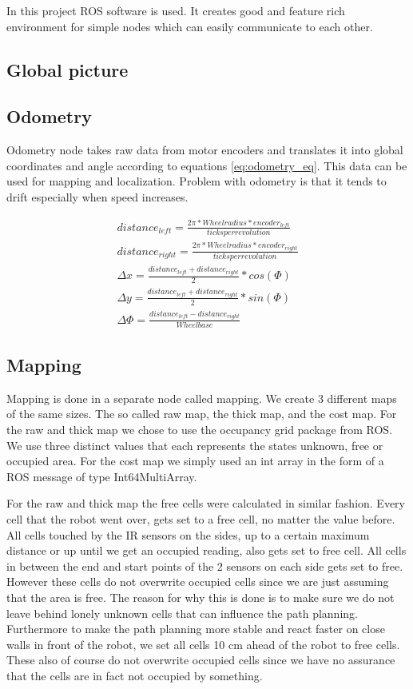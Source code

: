 In this project ROS software is used. It creates good and feature rich environment for simple nodes which can easily communicate to each other.

\subsection{Global picture}
\subsection{Odometry}

Odometry node takes raw data from motor encoders and translates it into global coordinates and angle according to equations \ref{eq:odometry_eq}. This data can be used for mapping and localization. Problem with odometry is that it tends to drift especially when speed increases.

\label{eq:odometry_eq}
\begin{align}
distance _{left} = \frac{2\pi * Wheel radius * encoder _{left}}{ticks  per  revolution}  \\
distance _{right} = \frac{2\pi * Wheel radius * encoder _{right}}{ticks  per  revolution} \\
\Delta x = \frac{distance _{left} + distance _{right}}{2} * cos(\Phi) \\
\Delta y = \frac{distance _{left} + distance _{right}}{2} * sin(\Phi) \\
\Delta \Phi = \frac{distance _{left} - distance _{right}}{Wheelbase}
\end{align}




\subsection{Mapping}
Mapping is done in a separate node called mapping. We create 3 different maps of the same sizes. The so called raw map, the thick map, and the cost map. For the raw and thick map we chose to use the occupancy grid package from ROS. We use three distinct values that each represents the states unknown, free or occupied area. For the cost map we simply used an int array in the form of a ROS message of type Int64MultiArray.

For the raw and thick map the free cells were calculated in similar fashion. Every cell that the robot went over, gets set to a free cell, no matter the value before. All cells touched by the IR sensors on the sides, up to a certain maximum distance or up until we get an occupied reading, also gets set to free cell. All cells in between the end and start points of the 2 sensors on each side gets set to free. However these cells do not overwrite occupied cells since we are just assuming that the area is free. The reason for why this is done is to make sure we do not leave behind lonely unknown cells that can influence the path planning. Furthermore to make the path planning more stable and react faster on close walls in front of the robot, we set all cells 10 cm ahead of the robot to free cells. These also of course do not overwrite occupied cells since we have no assurance that the cells are in fact not occupied by something. 

